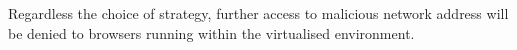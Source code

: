 Regardless the choice of strategy, further access to malicious network address will be denied to browsers running within the virtualised environment.



%



%


